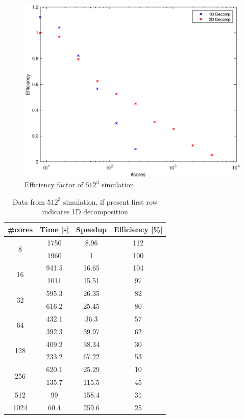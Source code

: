 \begin{figure}
\begin{center}
\includegraphics[scale=0.6]{grafici/5123}
\caption{Efficiency factor of $512^3$ simulation}
\label{5123}
\end{center}
\end{figure}


\begin{table}[h]
\caption{Data from $512^{3}$ simulation, if present first row indicates 1D decomposition}
\begin{center}
\begin{tabular}{c c c c}
\toprule
\textbf{\#cores} & \textbf{Time [s]} & \textbf{Speedup} & \textbf{Efficiency [\%]} \\
\midrule
\multirow{2}{*}{8} & 1750 & 8.96 & 112 \\
& 1960 & 1 & 100 \\
\hline
\multirow{2}{*}{16} & 941.5 & 16.65 & 104 \\
& 1011 & 15.51 & 97 \\
\hline
\multirow{2}{*}{32} & 595.3 & 26.35 & 82 \\
& 616.2 & 25.45 & 80 \\
\hline
\multirow{2}{*}{64} & 432.1 & 36.3 & 57 \\
& 392.3 & 39.97 & 62 \\
\hline
\multirow{2}{*}{128} & 409.2 & 38.34 & 30 \\
& 233.2 & 67.22 & 53 \\
\hline
\multirow{2}{*}{256} & 620.1 & 25.29 & 10 \\
& 135.7 & 115.5 & 45 \\
\hline
512 & 99 & 158.4 & 31 \\
1024 & 60.4 & 259.6 & 25 \\

\bottomrule
\end{tabular}
\end{center}
\label{512data}
\end{table}%